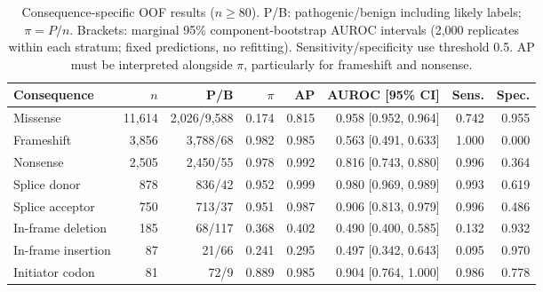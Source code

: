 \begin{table}[t]
\caption{Consequence-specific OOF results ($n\geq80$). P/B: pathogenic/benign including likely labels; $\pi=P/n$. Brackets: marginal 95\% component-bootstrap AUROC intervals (2,000 replicates within each stratum; fixed predictions, no refitting). Sensitivity/specificity use threshold 0.5. AP must be interpreted alongside $\pi$, particularly for frameshift and nonsense.}
\label{tab:consequence}
\centering\footnotesize
\setlength{\tabcolsep}{3.0pt}
\begin{tabular}{@{}lrrrrrrr@{}}
\toprule
Consequence & $n$ & P/B & $\pi$ & AP & AUROC [95\% CI] & Sens. & Spec. \\
\midrule
Missense & 11,614 & 2,026/9,588 & 0.174 & 0.815 & 0.958 [0.952, 0.964] & 0.742 & 0.955 \\
Frameshift & 3,856 & 3,788/68 & 0.982 & 0.985 & 0.563 [0.491, 0.633] & 1.000 & 0.000 \\
Nonsense & 2,505 & 2,450/55 & 0.978 & 0.992 & 0.816 [0.743, 0.880] & 0.996 & 0.364 \\
Splice donor & 878 & 836/42 & 0.952 & 0.999 & 0.980 [0.969, 0.989] & 0.993 & 0.619 \\
Splice acceptor & 750 & 713/37 & 0.951 & 0.987 & 0.906 [0.813, 0.979] & 0.996 & 0.486 \\
In-frame deletion & 185 & 68/117 & 0.368 & 0.402 & 0.490 [0.400, 0.585] & 0.132 & 0.932 \\
In-frame insertion & 87 & 21/66 & 0.241 & 0.295 & 0.497 [0.342, 0.643] & 0.095 & 0.970 \\
Initiator codon & 81 & 72/9 & 0.889 & 0.985 & 0.904 [0.764, 1.000] & 0.986 & 0.778 \\
\bottomrule
\end{tabular}
\end{table}
